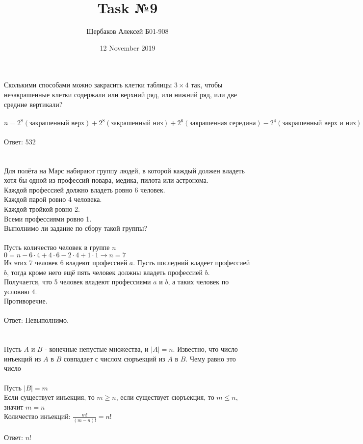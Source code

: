 \documentclass{article}
\title{Task №9}
\author{Щербаков Алексей Б01-908}
\date{12 November 2019}
\begin{document}
\maketitle
\section{}
Сколькими способами можно закрасить клетки таблицы $3\times 4$ так, чтобы незакрашенные клетки содержали или верхний ряд, или нижний ряд, или две средние вертикали?\\\\
$n = 2^8 (\text{закрашенный верх}) + 2^8 (\text{закрашенный низ}) + 2^6(\text{закрашенная середина}) - 2^4 (\text{закрашенный верх и низ}) - 2^4 (\text{закрашенный верх и середина}) - 2^4 (\text{закрашенный низ и середина}) + 2^2 (\text{закрашенный верх, низ и середина}) = 532$
\\\\
Ответ: 532
\section{}
Для полёта на Марс набирают группу людей, в которой каждый должен владеть хотя бы одной из профессий повара, медика, пилота или астронома. \\Каждой профессией должно владеть ровно 6 человек. \\Каждой парой ровно 4 человека. \\Каждой тройкой ровно 2. \\Всеми профессиями ровно 1. \\Выполнимо ли задание по сбору такой группы?\\\\
Пусть количество человек в группе $n$\\
$0 = n - 6 \cdot 4 + 4 \cdot 6  - 2 \cdot 4 + 1 \cdot 1 \rightarrow n = 7$\\
Из этих 7 человек 6 владеют профессией $a$. Пусть последний владеет профессией $b$, тогда кроме него ещё пять человек должны владеть профессией $b$. \\Получается, что 5 человек владеют профессиями $a$ и $b$, а таких человек по условию 4. \\Противоречие.
\\\\
Ответ: Невыполнимо.
\section{}
Пусть $A$ и $B$ - конечные непустые множества, и $|A| = n$. Известно, что число инъекций из $A$ в $B$ совпадает с числом сюръекций из $A$ в $B$. Чему равно это число\\\\
Пусть $|B| = m$\\
Если существует инъекция, то $m \geq n$, если существует сюръекция, то $m \leq n$, значит $m=n$\\
Количество инъекций: $\frac{m!}{(m-n)!} = n!$\\\\
Ответ: $n!$
\end{document}
